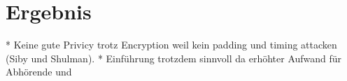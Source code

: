 \chapter{Ergebnis}

\begin{draft}
\begin{markdown}
* Keine gute Privicy trotz Encryption weil kein padding und timing attacken (Siby und Shulman). 
* Einführung trotzdem sinnvoll da erhöhter Aufwand für Abhörende und 
\end{markdown}
\end{draft}